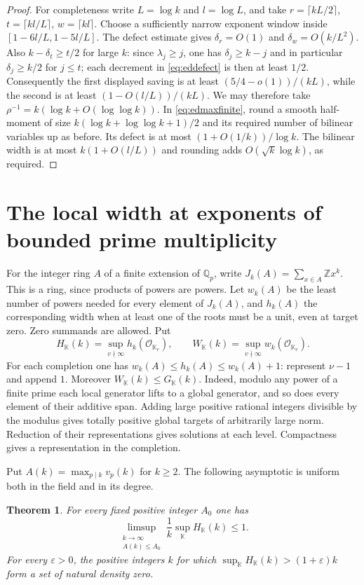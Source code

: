 \documentclass[11pt,letterpaper]{article}
\newtheorem{theorem}{Theorem}[section]
\theoremstyle{definition}
\numberwithin{equation}{section}
\begin{document}
\begin{proof}
For completeness write $L=\log k$ and $l=\log L$, and take
$r=\lceil kL/2\rceil$, $t=\lceil kl/L\rceil$,
$w=\lceil kl\rceil$. Choose a sufficiently narrow exponent window
inside $[1-6l/L,1-5l/L]$. The defect estimate gives
$\delta_r=O(1)$ and $\delta_w=O(k/L^2)$. Also $k-\delta_t\ge t/2$
for large $k$: since $\lambda_j\ge j$, one has $\delta_j\ge k-j$
and in particular $\delta_j\ge k/2$ for $j\le t$; each decrement
in \eqref{eq:eddefect} is then at least $1/2$.
Consequently the first displayed saving is at least
$(5/4-o(1))/(kL)$, while the second is at least
$(1-O(l/L))/(kL)$. We may therefore take
$\rho^{-1}=k(\log k+O(\log\log k))$. In
\eqref{eq:edmaxfinite}, round a smooth half-moment of size
$k(\log k+\log\log k+1)/2$ and its required number of bilinear
variables up as before. Its defect is at most
$(1+O(1/k))/\log k$. The bilinear width is at most
$k(1+O(l/L))$ and rounding adds $O(\sqrt{k}\log k)$,
as required.
\end{proof}

\section{The local width at exponents of bounded prime multiplicity}
\label{sec:nf-local}

For the integer ring $A$ of a finite extension of $\mathbb Q_p$, write
$J_k(A)=\sum_{x\in A}\mathbb Z x^k$. This is a ring, since products of
powers are powers. Let $w_k(A)$ be the least number of powers needed for
every element of $J_k(A)$, and $h_k(A)$ the corresponding width when
at least one of the roots must be a unit, even at target zero. Zero
summands are allowed. Put
\[
 H_{\mathbb K}(k)=\sup_{v\nmid\infty}h_k(\mathcal O_{\mathbb K_v}),
 \qquad W_{\mathbb K}(k)=\sup_{v\nmid\infty}w_k(\mathcal O_{\mathbb K_v}).
\]
For each completion one has $w_k(A)\le h_k(A)\le w_k(A)+1$:
represent $\nu-1$ and append $1$. Moreover
$W_{\mathbb K}(k)\le G_{\mathbb K}(k)$. Indeed, modulo any power of
a finite prime each local generator lifts to a global generator, and
so does every element of their additive span. Adding large positive
rational integers divisible by the modulus gives totally positive
global targets of arbitrarily large norm. Reduction of their
representations gives solutions at each level. Compactness gives
a representation in the completion.

Put $A(k)=\max_{p\mid k}v_p(k)$ for $k\ge2$. The following asymptotic
is uniform both in the field and in its degree.
\begin{theorem}\label{thm:nf-bounded-multiplicity}
For every fixed positive integer $A_0$ one has
\[
 \limsup_{\substack{k\to\infty\\A(k)\le A_0}}
 \frac1k\sup_{\mathbb K}H_{\mathbb K}(k)\le1.
\]
For every $\varepsilon>0$, the positive integers $k$ for which
$\sup_{\mathbb K}H_{\mathbb K}(k)>(1+\varepsilon)k$ form a set of
natural density zero.
\end{theorem}
\end{document}
